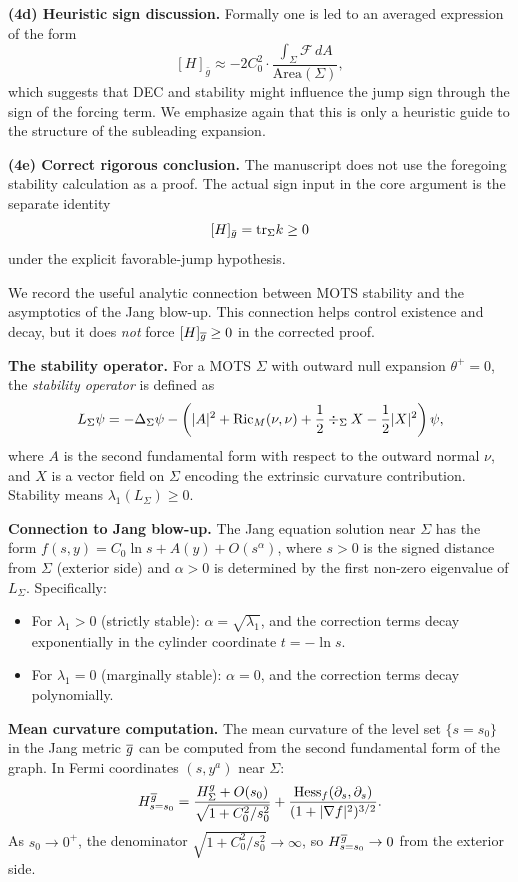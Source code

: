 \begin{remark}
\textbf{(4d) Heuristic sign discussion.}
Formally one is led to an averaged expression of the form
\[
    [H]_{\bar{g}} \approx -2C_0^2 \cdot \frac{\int_\Sigma \mathcal{F}\, dA}{\text{Area}(\Sigma)},
\]
which suggests that DEC and stability might influence the jump sign through the sign of the forcing term. We emphasize again that this is only a heuristic guide to the structure of the subleading expansion.

\textbf{(4e) Correct rigorous conclusion.}
The manuscript does not use the foregoing stability calculation as a proof. The actual sign input in the core argument is the separate identity
\[
    [H]_{\bar g}=\mathrm{tr}_\Sigma k\ge 0
\]
under the explicit favorable-jump hypothesis.
\end{remark}

\begin{remark}\label{rem:StabilityJangConnection}
We record the useful analytic connection between MOTS stability and the asymptotics of the Jang blow-up. This connection helps control existence and decay, but it does \emph{not} force $[H]_{\overline{g}}\ge0$ in the corrected proof.

\textbf{The stability operator.} For a MOTS $\Sigma$ with outward null expansion $\theta^+ = 0$, the \emph{stability operator} is defined as
\[
    L_\Sigma \psi = -\Delta_\Sigma \psi - \left( |A|^2 + \mathrm{Ric}_M(\nu, \nu) + \frac{1}{2}\div_\Sigma X - \frac{1}{2}|X|^2 \right) \psi,
\]
where $A$ is the second fundamental form with respect to the outward normal $\nu$, and $X$ is a vector field on $\Sigma$ encoding the extrinsic curvature contribution. Stability means $\lambda_1(L_\Sigma) \ge 0$.

\textbf{Connection to Jang blow-up.} The Jang equation solution near $\Sigma$ has the form $f(s, y) = C_0 \ln s + A(y) + O(s^\alpha)$, where $s > 0$ is the signed distance from $\Sigma$ (exterior side) and $\alpha > 0$ is determined by the first non-zero eigenvalue of $L_\Sigma$. Specifically:
\begin{itemize}
    \item For $\lambda_1 > 0$ (strictly stable): $\alpha = \sqrt{\lambda_1}$, and the correction terms decay exponentially in the cylinder coordinate $t = -\ln s$.
    \item For $\lambda_1 = 0$ (marginally stable): $\alpha = 0$, and the correction terms decay polynomially.
\end{itemize}

\textbf{Mean curvature computation.} The mean curvature of the level set $\{s = s_0\}$ in the Jang metric $\overline{g}$ can be computed from the second fundamental form of the graph. In Fermi coordinates $(s, y^a)$ near $\Sigma$:
\[
    H^{\overline{g}}_{s = s_0} = \frac{H^g_\Sigma + O(s_0)}{\sqrt{1 + C_0^2/s_0^2}} + \frac{\text{Hess}_f(\partial_s, \partial_s)}{(1 + |\nabla f|^2)^{3/2}}.
\]
As $s_0 \to 0^+$, the denominator $\sqrt{1 + C_0^2/s_0^2} \to \infty$, so $H^{\overline{g}}_{s=s_0} \to 0$ from the exterior side.


\end{remark}
